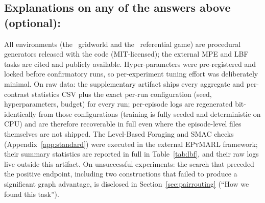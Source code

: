 \begin{appendices}
\subsection*{Explanations on any of the answers above (optional):}
All environments (the \coordgrid\ gridworld and the \tokenmatch\ referential game) are
procedural generators released with the code (MIT-licensed); the external MPE and LBF
tasks are cited and publicly available. Hyper-parameters were pre-registered and locked
before confirmatory runs, so per-experiment tuning effort was deliberately minimal.
On raw data: the supplementary artifact ships every aggregate and per-contrast
statistics CSV plus the exact per-run configuration (seed, hyperparameters,
budget) for every run; per-episode logs are regenerated bit-identically from
those configurations (training is fully seeded and deterministic on CPU) and
are therefore recoverable in full even where the episode-level files themselves are not shipped. The Level-Based Foraging
and SMAC checks (Appendix~\ref{app:standard}) were executed in the external
\textsc{EPyMARL} framework; their summary statistics are reported in full in
Table~\ref{tab:lbf}, and their raw logs live outside this artifact.
On unsuccessful experiments: the search that preceded the positive endpoint,
including two constructions that failed to produce a significant graph
advantage, is disclosed in Section~\ref{sec:pairrouting}
(``How we found this task'').
\end{appendices}


